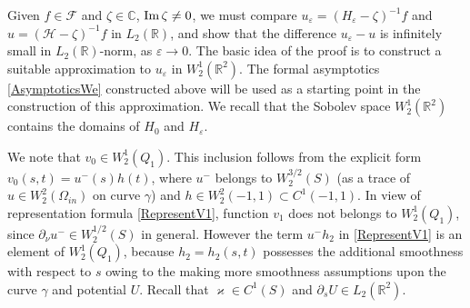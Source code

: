 \documentclass[reqno]{amsart}
\theoremstyle{plain}
\numberwithin{equation}{section}
\renewcommand{\Im}{\mathop{\rm Im}}
\renewcommand{\kappa}{\varkappa}
\newcommand{\Real}{\mathbb R}
\newcommand{\Cmpl}{\mathbb C}
\newcommand{\eps}{\varepsilon}
\newcommand{\cF}{\mathcal{F}}
\begin{document}
Given $f\in \cF$ and $\zeta\in \Cmpl$, $\Im \zeta \neq 0$, we must compare $u_\eps=(H_\eps-\zeta)^{-1}f$ and $u=(\mathcal{H}-\zeta)^{-1}f$ in $L_2(\Real)$, and show that the difference $u_\eps-u$ is infinitely small in $L_2(\Real)$-norm, as $\eps\to 0$.
The basic idea of the proof is to construct a suitable approximation to $u_\eps$ in  $W_2^1(\Real^2)$.
The formal asymptotics \eqref{AsymptoticsWe} constructed above  will be used as a starting point in the construction of this approximation.
We recall that the Sobolev space $W_2^1(\Real^2)$ contains the domains
of $H_0$ and $H_\eps$.


We note that $v_0\in W_2^1(Q_1)$. This inclusion follows from the explicit form $v_0(s,t)=u^-(s)h(t)$, where  $u^-$ belongs to
$W_2^{3/2}(S)$ (as a trace of $u\in W_2^2(\Omega_{in})$  on curve  $\gamma$) and $h\in W_2^2(-1,1)\subset C^1(-1,1)$.
In view of representation formula \eqref{RepresentV1}, function $v_1$ does not belongs to $W_2^1(Q_1)$, since $\partial_\nu u^-\in W_2^{1/2}(S)$ in general.  However the term $u^- h_2$ in \eqref{RepresentV1} is an element of $W_2^1(Q_1)$, because $h_2=h_2(s,t)$ possesses the additional smoothness with respect to $s$ owing to the making more smoothness assumptions upon the curve $\gamma$ and potential $U$. Recall that $\kappa\in C^1(S)$ and $\partial_s U\in L_2(\Real^2)$.
\end{document}
